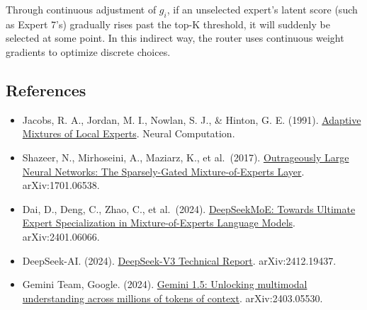 Through continuous adjustment of \(g_i\), if an unselected expert's latent score (such as Expert 7's) gradually rises past the top-K threshold, it will suddenly be selected at some point. In this indirect way, the router uses continuous weight gradients to optimize discrete choices.

\FloatBarrier
{}
\hypertarget{references-77}{%
\subsection{References}\label{references-77}}

\vspace{0.25em}
\begin{itemize}
\tightlist
\item
  Jacobs, R. A., Jordan, M. I., Nowlan, S. J., \& Hinton, G. E. (1991). \href{https://doi.org/10.1162/neco.1991.3.1.79}{Adaptive Mixtures of Local Experts}. Neural Computation.
\item
  Shazeer, N., Mirhoseini, A., Maziarz, K., et al.~(2017). \href{https://arxiv.org/abs/1701.06538}{Outrageously Large Neural Networks: The Sparsely-Gated Mixture-of-Experts Layer}. arXiv:1701.06538.
\item
  Dai, D., Deng, C., Zhao, C., et al.~(2024). \href{https://arxiv.org/abs/2401.06066}{DeepSeekMoE: Towards Ultimate Expert Specialization in Mixture-of-Experts Language Models}. arXiv:2401.06066.
\item
  DeepSeek-AI. (2024). \href{https://arxiv.org/abs/2412.19437}{DeepSeek-V3 Technical Report}. arXiv:2412.19437.
\item
  Gemini Team, Google. (2024). \href{https://arxiv.org/abs/2403.05530}{Gemini 1.5: Unlocking multimodal understanding across millions of tokens of context}. arXiv:2403.05530.
\end{itemize}

\clearpage
